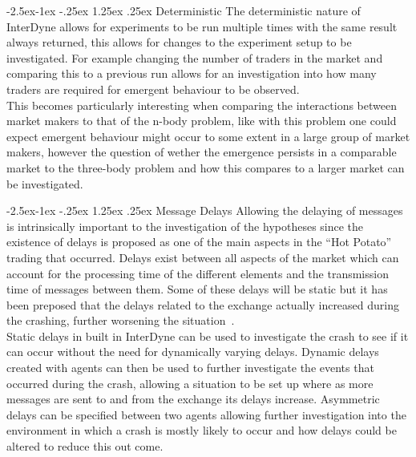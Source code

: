 \documentclass{article}
\makeatletter
\renewcommand\paragraph{\@startsection{paragraph}{4}{\z@}%
	{-2.5ex\@plus -1ex \@minus -.25ex}%
	{1.25ex \@plus .25ex}%
	{\normalfont\normalsize\bfseries}}
\makeatother
\begin{document}
\paragraph{Deterministic}
The deterministic nature of InterDyne allows for experiments to be run multiple times with the same result always returned, this allows for changes to the experiment setup to be investigated. For example changing the number of traders in the market and comparing this to a previous run allows for an investigation into how many traders are required for emergent behaviour to be observed.\\
This becomes particularly interesting when comparing the interactions between market makers to that of the n-body problem, like with this problem one could expect emergent behaviour might occur to some extent in a large group of market makers, however the question of wether the emergence persists in a comparable market to the three-body problem and how this compares to a larger market can be investigated.   


\paragraph{Message Delays}
Allowing the delaying of messages is intrinsically important to the investigation of the hypotheses since the existence of delays is proposed as one of the main aspects in the ``Hot Potato'' trading that occurred. Delays exist between all aspects of the market which can account for the processing time of the different elements and the transmission time of messages between them. Some of these delays will be static but it has been preposed that the delays related to the exchange actually increased during the crashing, further worsening the situation~\cite{SECreport_delays}.\\
Static delays in built in InterDyne can be used to investigate the crash to see if it can occur without the need for dynamically varying delays. Dynamic delays created with agents can then be used to further investigate the events that occurred during the crash, allowing a situation to be set up where as more messages are sent to and from the exchange its delays increase.  Asymmetric delays can be specified between two agents allowing further investigation into the environment in which a crash is mostly likely to occur and how delays could be altered to reduce this out come. 
\end{document}
